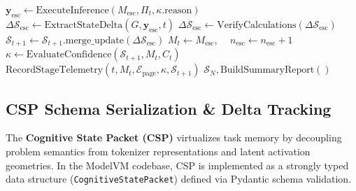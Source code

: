 \begin{algorithm}[htbp]
\begin{algorithmic}[1]
        \State $\mathbf{y}_{\text{esc}} \gets \text{ExecuteInference}(M_{\text{esc}}, \Pi_t, \kappa.\text{reason})$
        \State $\Delta \mathcal{S}_{\text{esc}} \gets \text{ExtractStateDelta}(G, \mathbf{y}_{\text{esc}}, t)$
        \State $\Delta \mathcal{S}_{\text{esc}} \gets \text{VerifyCalculations}(\Delta \mathcal{S}_{\text{esc}})$
        \State $\mathcal{S}_{t+1} \gets \mathcal{S}_{t+1}.\text{merge\_update}(\Delta \mathcal{S}_{\text{esc}})$
        \State $M_t \gets M_{\text{esc}}$, $\quad n_{\text{esc}} \gets n_{\text{esc}} + 1$
        \State $\kappa \gets \text{EvaluateConfidence}(\mathcal{S}_{t+1}, M_t, C_t)$
    \EndWhile
    \State $\text{RecordStageTelemetry}(t, M_t, \mathcal{E}_{\text{page}}, \kappa, \mathcal{S}_{t+1})$
\EndFor
\State \Return $\mathcal{S}_N, \text{BuildSummaryReport}()$
\end{algorithmic}
\end{algorithm}

\subsection{CSP Schema Serialization \& Delta Tracking}
\label{sec:csp_serialization}

The \textbf{Cognitive State Packet (CSP)} virtualizes task memory by decoupling problem semantics from tokenizer representations and latent activation geometries. In the ModelVM codebase, CSP is implemented as a strongly typed data structure (\texttt{CognitiveStatePacket}) defined via Pydantic schema validation.

